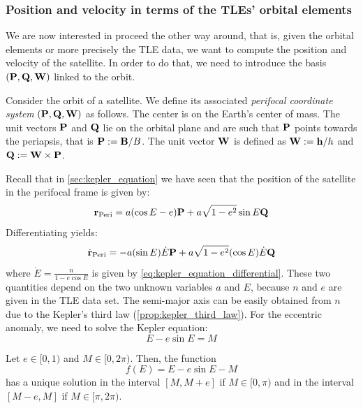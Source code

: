 \documentclass[../main.tex]{subfiles}
\begin{document}
\subsubsection{Position and velocity in terms of the TLEs' orbital elements}
We are now interested in proceed the other way around, that is, given the orbital elements or more precisely the TLE data, we want to compute the position and velocity of the satellite. In order to do that, we need to introduce the basis $(\boldsymbol{\mathrm{P}}, \boldsymbol{\mathrm{Q}}, \boldsymbol{\mathrm{W}})$ linked to the orbit.
\begin{definition}\label{def:perifocal_coordinate_system}
  Consider the orbit of a satellite. We define its associated \emph{perifocal coordinate system} $(\boldsymbol{\mathrm{P}}, \boldsymbol{\mathrm{Q}}, \boldsymbol{\mathrm{W}})$ as follows. The center is on the Earth's center of mass. The unit vectors $\boldsymbol{\mathrm{P}}$ and $\boldsymbol{\mathrm{Q}}$ lie on the orbital plane and are such that $\boldsymbol{\mathrm{P}}$ points towards the periapsis, that is $\boldsymbol{\mathrm{P}}:=\boldsymbol{\mathrm{B}}/B$. The unit vector $\boldsymbol{\mathrm{W}}$ is defined as $\boldsymbol{\mathrm{W}}:=\boldsymbol{\mathrm{h}}/h$ and $\boldsymbol{\mathrm{Q}}:=\boldsymbol{\mathrm{W}}\times\boldsymbol{\mathrm{P}}$.
\end{definition}
Recall that in \cref{sec:kepler_equation} we have seen that the position of the satellite in the perifocal frame is given by:
\begin{equation}
  \boldsymbol{\mathrm{r}}_\mathrm{Peri} = a(\cos E-e)\boldsymbol{\mathrm{P}} + a\sqrt{1-e^2}\sin E\boldsymbol{\mathrm{Q}}
\end{equation}
Differentiating yields:
\begin{equation}
  \dot{\boldsymbol{\mathrm{r}}}_\mathrm{Peri} = - a (\sin E)\dot{E}\boldsymbol{\mathrm{P}}+a\sqrt{1-e^2}(\cos E)\dot{E}\boldsymbol{\mathrm{Q}}
\end{equation}
where $\dot{E}=\frac{n}{1-e\cos E}$ is given by \cref{eq:kepler_equation_differential}. These two quantities depend on the two unknown variables $a$ and $E$, because $n$ and $e$ are given in the TLE data set. The semi-major axis can be easily obtained from $n$ due to the Kepler's third law (\cref{prop:kepler_third_law}). For the eccentric anomaly, we need to solve the Kepler equation:
\begin{equation}
  E-e\sin E = M
\end{equation}
\begin{lemma}
  Let $e\in[0,1)$ and $M\in[0,2\pi)$. Then, the function
  \begin{equation}
    f(E) = E-e\sin E - M
  \end{equation}
  has a unique solution in the interval $[M, M+e]$ if $M\in[0,\pi)$ and in the interval $[M-e, M]$ if $M\in[\pi,2\pi)$.
\end{lemma}
\end{document}

